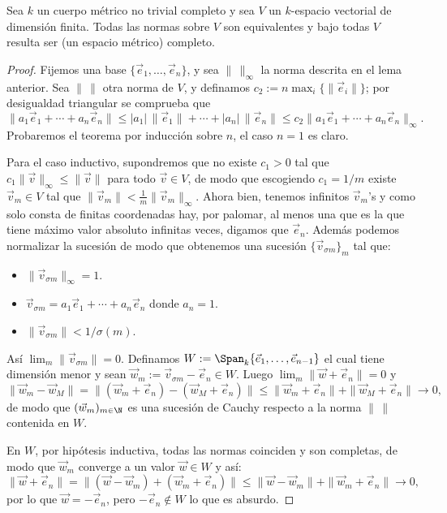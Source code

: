\documentclass[teoria-numeros.tex]{subfiles}
\begin{document}
\begin{thm}\label{thm:normed_space_over_compl}
	Sea $k$ un cuerpo métrico no trivial completo y sea $V$ un $k$-espacio vectorial de dimensión finita.
	Todas las normas sobre $V$ son equivalentes y bajo todas $V$ resulta ser (un espacio métrico) completo.
\end{thm}
\begin{proof}
	Fijemos una base $\{ \vec e_1, \dots, \vec e_n \}$, y sea $\|\,\|_\infty$ la norma descrita en el lema anterior.
	Sea $\|\,\|$ otra norma de $V$, y definamos $c_2 := n\max_i \{ \|\vec e_i\| \}$; por desigualdad triangular se comprueba que
	$$ \|a_1\vec e_1 + \cdots + a_n\vec e_n\| \le |a_1| \, \|\vec e_1\| + \cdots + |a_n| \, \|\vec e_n\|
	\le c_2 \|a_1\vec e_1 + \cdots + a_n\vec e_n\|_\infty. $$
	Probaremos el teorema por inducción sobre $n$, el caso $n = 1$ es claro.

	Para el caso inductivo, supondremos que no existe $c_1 > 0$ tal que $c_1 \|\vec v\|_\infty \le \|\vec v\|$ para todo $\vec v \in V$,
	de modo que escogiendo $c_1 = 1/m$ existe $\vec v_m \in V$ tal que $\|\vec v_m\| < \frac{1}{m} \|\vec v_m\|_\infty$.
	Ahora bien, tenemos infinitos $\vec v_m$'s y como solo consta de finitas coordenadas hay, por palomar, al menos una que es la que tiene máximo
	valor absoluto infinitas veces, digamos que $\vec e_n$.
	Además podemos normalizar la sucesión de modo que obtenemos una sucesión $\{ \vec v_{\sigma m} \}_m$ tal que:
	\begin{itemize}
		\item $\|\vec v_{\sigma m}\|_\infty = 1$.
		\item $\vec v_{\sigma m} = a_1\vec e_1 + \cdots + a_n\vec e_n$ donde $a_n = 1$.
		\item $\|\vec v_{\sigma m}\| < 1/\sigma(m)$.
	\end{itemize}
	Así $\lim_m \|\vec v_{\sigma m}\| = 0$.
	Definamos $W := \Span_k\{ \vec e_1, \dots, \vec e_{n-1} \}$ el cual tiene dimensión menor y sean $\vec w_m := \vec v_{\sigma m} - \vec e_n \in W$.
	Luego $\lim_m \|\vec w + \vec e_n\| = 0$ y
	$$ \| \vec w_m - \vec w_M \| = \| (\vec w_m + \vec e_n) - (\vec w_M + \vec e_n) \| \le \| \vec w_m + \vec e_n \| + \| \vec w_M + \vec e_n \| \to 0, $$
	de modo que $( \vec w_m )_{m\in\N}$ es una sucesión de Cauchy respecto a la norma $\|\,\|$ contenida en $W$.

	En $W$, por hipótesis inductiva, todas las normas coinciden y son completas, de modo que $\vec w_m$ converge a un valor $\vec w \in W$ y así:
	$$ \|\vec w + \vec e_n\| = \|(\vec w - \vec w_m) + (\vec w_m + \vec e_n)\| \le \|\vec w - \vec w_m\| + \|\vec w_m + \vec e_n\| \to 0, $$
	por lo que $\vec w = -\vec e_n$, pero $-\vec e_n \notin W$ lo que es absurdo.
\end{proof}
\end{document}
